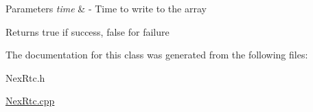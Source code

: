\begin{DoxyParams}{Parameters}
{\em time} & -\/ Time to write to the array \\
\hline
\end{DoxyParams}
\begin{DoxyReturn}{Returns}
true if success, false for failure 
\end{DoxyReturn}


The documentation for this class was generated from the following files\+:\begin{DoxyCompactItemize}
\item 
Nex\+Rtc.\+h\item 
\hyperlink{_nex_rtc_8cpp}{Nex\+Rtc.\+cpp}\end{DoxyCompactItemize}
